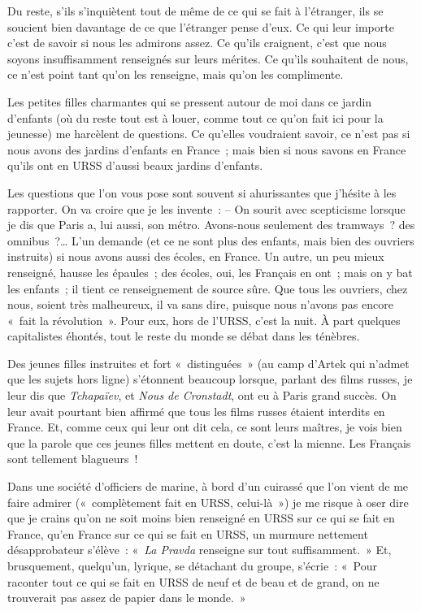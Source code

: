 \documentclass[french,twoside]{book} %
\newcommand{\astermono}{\medskip\centerline{\color{rubric}\large\selectfont{\syms ✻}}\medskip\par}%
\begin{document}
\astermono

\noindent Du reste, s’ils s’inquiètent tout de même de ce qui se fait à l’étranger, ils se soucient bien davantage de ce que l’étranger pense d’eux. Ce qui leur importe c’est de savoir si nous les admirons assez. Ce qu’ils craignent, c’est que nous soyons insuffisamment renseignés sur leurs mérites. Ce qu’ils souhaitent de nous, ce n’est point tant qu’on les renseigne, mais qu’on les complimente.\par
Les petites filles charmantes qui se pressent autour de moi dans ce jardin d’enfants (où du reste tout est à louer, comme tout ce qu’on fait ici pour la jeunesse) me harcèlent de questions. Ce qu’elles voudraient savoir, ce n’est pas si nous avons des jardins d’enfants en France ; mais bien si nous savons en France qu’ils ont en URSS d’aussi beaux jardins d’enfants.\par
Les questions que l’on vous pose sont souvent si ahurissantes que j’hésite à les rapporter. On va croire que je les invente : – On sourit avec scepticisme lorsque je dis que Paris a, lui aussi, son métro. Avons-nous seulement des tramways ? des omnibus ?… L’un demande (et ce ne sont plus des enfants, mais bien des ouvriers instruits) si nous avons aussi des écoles, en France. Un autre, un peu mieux renseigné, hausse les épaules ; des écoles, oui, les Français en ont ; mais on y bat les enfants ; il tient ce renseignement de source sûre. Que tous les ouvriers, chez nous, soient très malheureux, il va sans dire, puisque nous n’avons pas encore « fait la révolution ». Pour eux, hors de l’URSS, c’est la nuit. À part quelques capitalistes éhontés, tout le reste du monde se débat dans les ténèbres.\par
Des jeunes filles instruites et fort « distinguées » (au camp d’Artek qui n’admet que les sujets hors ligne) s’étonnent beaucoup lorsque, parlant des films russes, je leur dis que \emph{Tchapaïev}, et \emph{Nous de Cronstadt}, ont eu à Paris grand succès. On leur avait pourtant bien affirmé que tous les films russes étaient interdits en France. Et, comme ceux qui leur ont dit cela, ce sont leurs maîtres, je vois bien que la parole que ces jeunes filles mettent en doute, c’est la mienne. Les Français sont tellement blagueurs !\par
Dans une société d’officiers de marine, à bord d’un cuirassé que l’on vient de me faire admirer (« complètement fait en URSS, celui-là ») je me risque à oser dire que je crains qu’on ne soit moins bien renseigné en URSS sur ce qui se fait en France, qu’en France sur ce qui se fait en URSS, un murmure nettement désapprobateur s’élève : « \emph{La Pravda} renseigne sur tout suffisamment. » Et, brusquement, quelqu’un, lyrique, se détachant du groupe, s’écrie : « Pour raconter tout ce qui se fait en URSS de neuf et de beau et de grand, on ne trouverait pas assez de papier dans le monde. »\par
\end{document}

